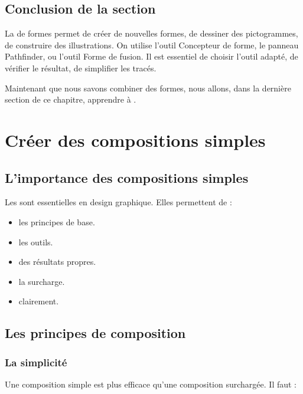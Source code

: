 \subsection*{Conclusion de la section}

La  de formes permet de créer de nouvelles formes, de dessiner des pictogrammes, de construire des illustrations. On utilise l'outil Concepteur de forme, le panneau Pathfinder, ou l'outil Forme de fusion. Il est essentiel de choisir l'outil adapté, de vérifier le résultat, de simplifier les tracés.

Maintenant que nous savons combiner des formes, nous allons, dans la dernière section de ce chapitre, apprendre à .

\section{Créer des compositions simples}

\subsection{L'importance des compositions simples}

Les  sont essentielles en design graphique. Elles permettent de :

\begin{itemize}
    \item {} les principes de base.
    \item {} les outils.
    \item {} des résultats propres.
    \item {} la surcharge.
    \item {} clairement.
\end{itemize}

\subsection{Les principes de composition}

\subsubsection{La simplicité}

Une composition simple est plus efficace qu'une composition surchargée. Il faut :


